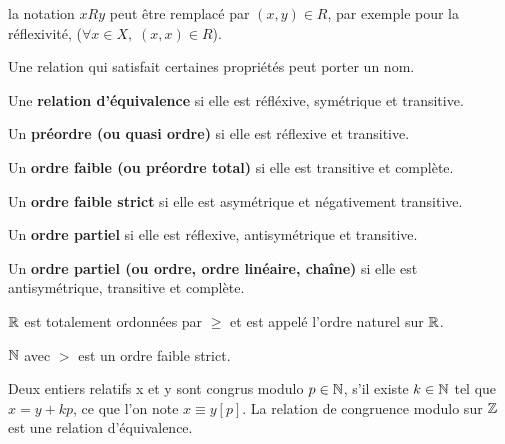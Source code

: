 \documentclass[a4paper, 12pt]{article}
\begin{document}
\begin{remark}
    la notation $xRy$ peut être remplacé par $(x, y) \in R$, par exemple pour la réflexivité, ($\forall x \in X, \; (x, x) \in R$).
\end{remark}

\vspace{2em}

Une relation qui satisfait certaines propriétés peut porter un nom.

\begin{ldefinition}
\item Une \textbf{relation d'équivalence} si elle est réfléxive, symétrique et transitive.
\item Un \textbf{préordre (ou quasi ordre)} si elle est réflexive et transitive.
\item Un \textbf{ordre faible (ou préordre total)} si elle est transitive et complète.
\item Un \textbf{ordre faible strict} si elle est asymétrique et négativement transitive.
\item Un \textbf{ordre partiel} si elle est réflexive, antisymétrique et transitive.
\item Un \textbf{ordre partiel (ou ordre, ordre linéaire, chaîne)} si elle est antisymétrique, transitive et complète.
\end{ldefinition}

\begin{lexample}
\item $\mathbb{R}$ est totalement ordonnées par $\geq$ et est appelé l'ordre naturel sur $\mathbb{R}$.
\item $\mathbb{N}$ avec $\gt$ est un ordre faible strict.
\item Deux entiers relatifs x et y sont congrus modulo $p \in \mathbb{N}$, s'il existe $k \in \mathbb{N}$ tel que $x = y + kp$, ce que l'on note $x \equiv y[p]$.
    La relation de congruence modulo sur $\mathbb{Z}$ est une relation d'équivalence.
\end{lexample}
\end{document}
